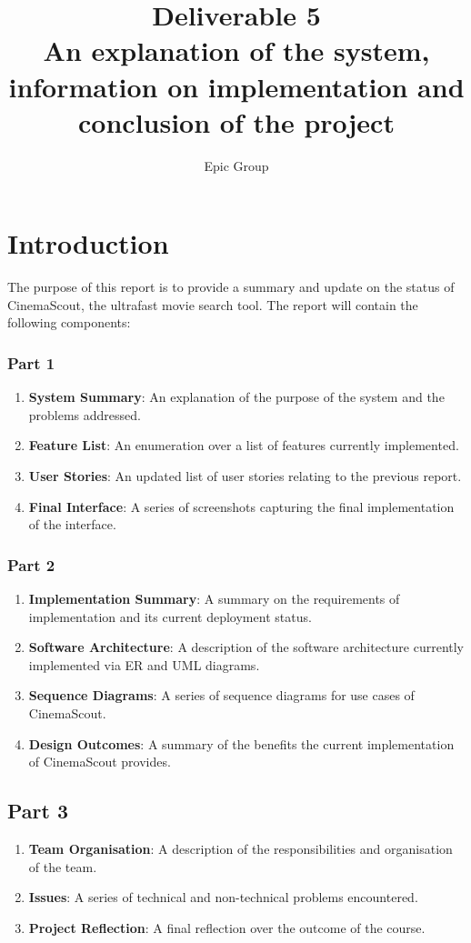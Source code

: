 \documentclass{article}
\begin{document}
\title{%
 Deliverable 5\\
 \large An explanation of the system, information on implementation and\\
 \large conclusion of the project
}
\author{Epic Group}
\date{}
\maketitle

\section*{Introduction}
The purpose of this report is to provide a summary and update on the status of
CinemaScout, the ultrafast movie search tool. The report will contain the following
components:
\subsubsection*{Part 1}
\begin{enumerate}
\item \textbf{System Summary}: An explanation of the purpose of the system
and the problems addressed.
\item \textbf{Feature List}: An enumeration over a list of features currently
implemented.
\item \textbf{User Stories}: An updated list of user stories relating to the
previous report.
\item \textbf{Final Interface}: A series of screenshots capturing the final
implementation of the interface.
\end{enumerate}
\subsubsection*{Part 2}
\begin{enumerate}
\item \textbf{Implementation Summary}: A summary on the requirements of
implementation and its current deployment status.
\item \textbf{Software Architecture}: A description of the software
architecture currently implemented via ER and UML diagrams.
\item \textbf{Sequence Diagrams}: A series of sequence diagrams for
use cases of CinemaScout.
\item \textbf{Design Outcomes}: A summary of the benefits the current 
implementation of CinemaScout provides.
\end{enumerate}
\subsection*{Part 3}
\begin{enumerate}
\item \textbf{Team Organisation}: A description of the responsibilities and
organisation of the team.
\item \textbf{Issues}: A series of technical and non-technical problems
encountered.
\item \textbf{Project Reflection}: A final reflection over the outcome of the
course.
\end{enumerate}
\end{document}
